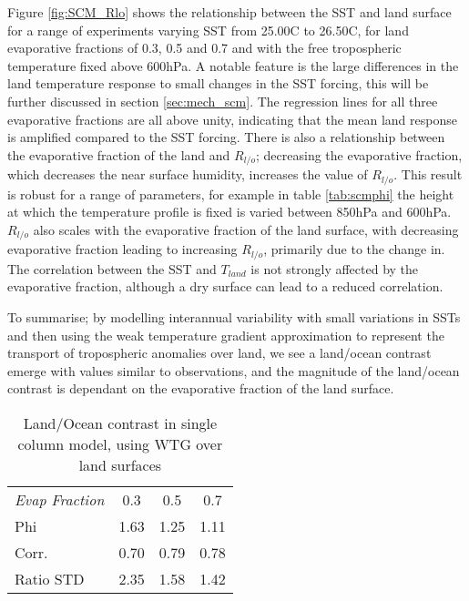 Figure \ref{fig:SCM_Rlo} shows the relationship between the SST and land surface 
for a range of experiments varying SST from 25.00C to 26.50C, for land 
evaporative fractions of 0.3, 0.5 and 0.7 and with the free tropospheric 
temperature fixed above 600hPa.  A notable feature is the large differences in 
the land temperature response to small changes in the SST forcing, this will be 
further discussed in section \ref{sec:mech_scm}. The regression lines for all 
three evaporative fractions are all above unity, indicating that the mean land 
response is amplified compared to the SST forcing. There is also a relationship 
between the evaporative fraction of the land and $R_{l/o}$; decreasing the 
evaporative fraction, which decreases the near surface humidity, increases the 
value of $R_{l/o}$. This result is robust for a range of parameters, for example 
in table \ref{tab:scmphi} the height at which the temperature profile is fixed 
is varied between 850hPa and 600hPa. $R_{l/o}$ also scales with the evaporative 
fraction of the land surface, with decreasing evaporative fraction leading to 
increasing $R_{l/o}$, primarily due to the change in.  The correlation 
between the SST and $T_{land}$ is not strongly affected by the evaporative 
fraction, although a dry surface can lead to a reduced correlation.

To summarise; by modelling interannual variability with small variations in SSTs 
and then using the weak temperature gradient approximation to represent the 
transport of tropospheric anomalies over land, we see a land/ocean contrast 
emerge with values similar to observations, and the magnitude of the land/ocean 
contrast is dependant on the evaporative fraction of the land surface.

\begin{center}
	\begin{table}[ht]
		\caption{Land/Ocean contrast in single column model, using WTG over land 
		surfaces}
		\label{tab:scm_evidence}
		\scriptsize
	\begin{tabular}{ l  c  c  c }
		\hline
		\textit{Evap Fraction}		& 0.3   & 0.5  & 0.7 \\ %
		Phi 						& 1.63  & 1.25 & 1.11\\ \hline
		Corr.						& 0.70  & 0.79 & 0.78\\ %
		Ratio STD           		& 2.35  & 1.58 & 1.42\\ \hline
	\end{tabular}
	\end{table}
\end{center}


